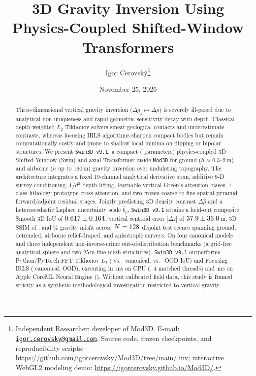 \documentclass[11pt,a4paper]{article}
\title{\textbf{3D Gravity Inversion Using Physics-Coupled Shifted-Window Transformers}}
\author{
  Igor Cerovsk\'y\thanks{Independent Researcher; developer of Mod3D. E-mail: \href{mailto:igor.cerovsky@gmail.com}{\texttt{igor.cerovsky@gmail.com}}. Source code, frozen checkpoints, and reproducibility scripts: \url{https://github.com/igorcerovsky/Mod3D/tree/main/.inv}; interactive WebGL2 modeling demo: \url{https://igorcerovsky.github.io/Mod3D/}.}
}
\date{November 25, 2026}
\begin{document}
\maketitle

\begin{abstract}
Three-dimensional vertical gravity inversion ($\Delta g_z \mapsto \Delta\rho$) is severely ill-posed due to analytical non-uniqueness and rapid geometric sensitivity decay with depth. Classical depth-weighted $L_2$ Tikhonov solvers smear geological contacts and underestimate contrasts, whereas focusing IRLS algorithms sharpen compact bodies but remain computationally costly and prone to shallow local minima on dipping or bipolar structures. We present \texttt{Swin3D v9.1}, a compact (\valVNineOneParams{} parameters) physics-coupled 3D Shifted-Window (Swin) and axial Transformer inside \texttt{Mod3D} for ground ($h \approx 0.3\text{--}2$\,m) and airborne ($h$ up to $160$\,m) gravity inversion over undulating topography. The architecture integrates a fixed 19-channel analytical derivative stem, additive 9-D survey conditioning, $1/d^2$ depth lifting, learnable vertical Green's attention biases, 7-class lithology prototype cross-attention, and two frozen coarse-to-fine spatial-pyramid forward/adjoint residual stages. Jointly predicting 3D density contrast $\Delta\hat{\rho}$ and a heteroscedastic Laplace uncertainty scale $\hat{b}_\rho$, \texttt{Swin3D v9.1} attains a held-out composite Smooth 3D IoU of $0.617{}\pm0.164{}$, vertical centroid error $|\Delta z|$ of $37.9{}\pm36.0{}$\,m, 3D SSIM of \valCompSSIM{}, and \valCompMisfit{}\% gravity misfit across $N=128{}$ disjoint test scenes spanning ground, detrended, airborne relief-draped, and anisotropic surveys. On four canonical models and three independent non-inverse-crime out-of-distribution benchmarks (a grid-free analytical sphere and two $25$\,m fine-mesh structures), \texttt{Swin3D v9.1} outperforms Python/PyTorch FFT Tikhonov $L_2$ (\valCanonMeanSwinIoU{} vs.\ \valCanonMeanTikIoU{} canonical; \valOodMeanSwinIoU{} vs.\ \valOodMeanTikIoU{} OOD IoU) and Focusing IRLS (\valCanonMeanFocIoU{} canonical; \valOodMeanFocIoU{} OOD), executing in \valTimeOnnxCpuMs{}\,ms on CPU (\valSpeedupOnnxVsFoc{}, 4 matched threads) and \valTimeCoremlMs{}\,ms on Apple CoreML Neural Engine (\valSpeedupCoremlVsFoc{}). Without calibrated field data, this study is framed strictly as a synthetic methodological investigation restricted to vertical gravity.
\end{abstract}
\end{document}
